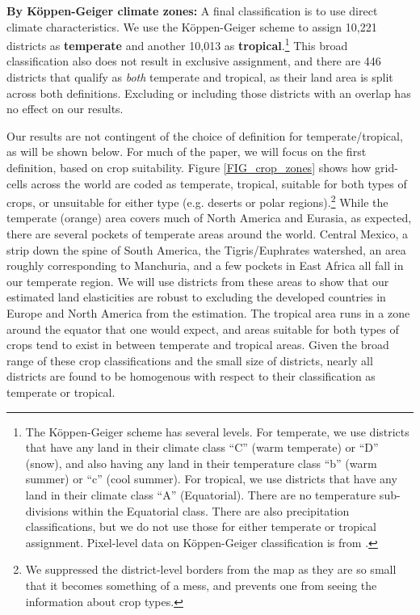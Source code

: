 \documentclass[11pt]{article}
\begin{document}
\vspace{.5cm}\noindent\textbf{By K{\"o}ppen-Geiger climate zones:} A final classification is to use direct climate characteristics. We use the K{\"o}ppen-Geiger scheme to assign 10,221 districts as \textbf{temperate} and another 10,013 as \textbf{tropical}.\footnote{The K{\"o}ppen-Geiger scheme has several levels. For temperate, we use districts that have any land in their climate class ``C'' (warm temperate) or ``D'' (snow), and also having any land in their temperature class ``b'' (warm summer) or ``c'' (cool summer). For tropical, we use districts that have any land in their climate class ``A'' (Equatorial). There are no temperature sub-divisions within the Equatorial class. There are also precipitation classifications, but we do not use those for either temperate or tropical assignment. Pixel-level data on K{\"o}ppen-Geiger classification is from \cite{kottek2006}.} This broad classification also does not result in exclusive assignment, and there are 446 districts that qualify as \textit{both} temperate and tropical, as their land area is split across both definitions. Excluding or including those districts with an overlap has no effect on our results.

\vspace{.5cm} 
Our results are not contingent of the choice of definition for temperate/tropical, as will be shown below. For much of the paper, we will focus on the first definition, based on crop suitability. Figure \ref{FIG_crop_zones} shows how grid-cells across the world are coded as temperate, tropical, suitable for both types of crops, or unsuitable for either type (e.g. deserts or polar regions).\footnote{We suppressed the district-level borders from the map as they are so small that it becomes something of a mess, and prevents one from seeing the information about crop types.} While the temperate (orange) area covers much of North America and Eurasia, as expected, there are several pockets of temperate areas around the world. Central Mexico, a strip down the spine of South America, the Tigris/Euphrates watershed, an area roughly corresponding to Manchuria, and a few pockets in East Africa all fall in our temperate region. We will use districts from these areas to show that our estimated land elasticities are robust to excluding the developed countries in Europe and North America from the estimation. The tropical area runs in a zone around the equator that one would expect, and areas suitable for both types of crops tend to exist in between temperate and tropical areas. Given the broad range of these crop classifications and the small size of districts, nearly all districts are found to be homogenous with respect to their classification as temperate or tropical.
\end{document}
